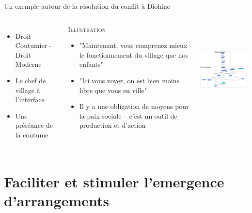 \documentclass[newPxFont]{beamer}
\begin{document}
  \begin{frame}[c]{Un exemple autour de la résolution du conflit à Diohine}
      \vspace{-1cm}
      \begin{columns}[onlytextwidth,T]
        \column{\dimexpr\linewidth-30mm-5mm}
        \begin{itemize}
          \item Droit Coutumier - Droit Moderne
          \item Le chef de village à l'interface
          \item Une préséance de la coutume
        \end{itemize}

        \small{
          \begin{exampleblock}{\textsc{Illustration}}
            \begin{itemize}
              \item "Maintenant, vous comprenez mieux le fonctionnement du village que nos enfants"
              \item "Ici vous voyez, on est bien moins libre que vous en ville"
              \item Il y a une obligation de moyens pour la paix sociale -- c'est un outil de production et d'action
            \end{itemize}
          \end{exampleblock}
        }
        \column{30mm}
        \vspace{1.5cm}
        \includegraphics[height=5cm]{img/zone_droit_conflits.png}
      \end{columns}
    \end{frame}


\section{Faciliter et stimuler l'emergence d'arrangements}
\end{document}
